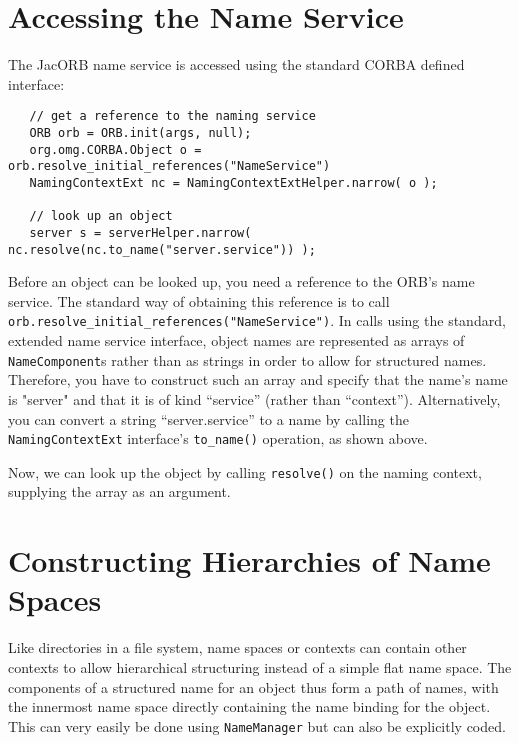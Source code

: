 \documentclass[12pt]{scrbook}
\begin{document}
\section{Accessing the Name Service}

The  JacORB name  service is accessed using  the standard  CORBA
defined  interface:

\small{
\begin{verbatim}
   // get a reference to the naming service
   ORB orb = ORB.init(args, null);
   org.omg.CORBA.Object o = orb.resolve_initial_references("NameService")
   NamingContextExt nc = NamingContextExtHelper.narrow( o );

   // look up an object
   server s = serverHelper.narrow( nc.resolve(nc.to_name("server.service")) );
\end{verbatim}
}

Before an object  can be looked up, you need a  reference to the ORB's
name service. The standard way  of obtaining this reference is to call
{\tt orb.resolve\_initial\_\-referen\-ces("Name\-Service")}.  In calls using
the  standard,  extended  name  service interface,  object  names  are
represented as  arrays of {\tt NameComponent}s rather  than as strings
in  order to  allow  for  structured names.   Therefore,  you have  to
construct such an  array and specify that the  name's name is "server"
and    that    it    is    of   kind    ``service''    (rather    than
``context'').    Alternatively,    you    can   convert    a    string
``server.service''  to a  name by  calling the  {\tt NamingContextExt}
interface's {\tt to\_name()} operation, as shown above.

Now,  we can  look up  the object  by calling  {\tt resolve()}  on the
naming context, supplying the array as an argument.

\section{Constructing Hierarchies of Name Spaces}

Like directories in a file system, name spaces or contexts can contain
other contexts  to allow hierarchical structuring instead  of a simple
flat name  space. The  components of a  structured name for  an object
thus  form a path  of names,  with the  innermost name  space directly
containing the  name binding for the  object. This can  very easily be
done using {\tt NameManager} but can also be explicitly coded.
\end{document}
